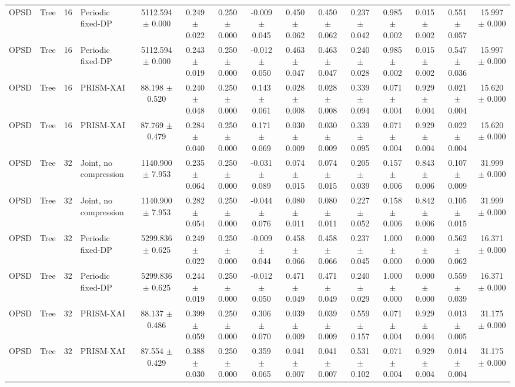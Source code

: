 \begin{tabular}{llllccccccccccc}
OPSD & Tree & 16 & Periodic fixed-DP & 5112.594 $\pm$ 0.000 & 0.249 $\pm$ 0.022 & 0.250 $\pm$ 0.000 & -0.009 $\pm$ 0.045 & 0.450 $\pm$ 0.062 & 0.450 $\pm$ 0.062 & 0.237 $\pm$ 0.042 & 0.985 $\pm$ 0.002 & 0.015 $\pm$ 0.002 & 0.551 $\pm$ 0.057 & 15.997 $\pm$ 0.000 \\
OPSD & Tree & 16 & Periodic fixed-DP & 5112.594 $\pm$ 0.000 & 0.243 $\pm$ 0.019 & 0.250 $\pm$ 0.000 & -0.012 $\pm$ 0.050 & 0.463 $\pm$ 0.047 & 0.463 $\pm$ 0.047 & 0.240 $\pm$ 0.028 & 0.985 $\pm$ 0.002 & 0.015 $\pm$ 0.002 & 0.547 $\pm$ 0.036 & 15.997 $\pm$ 0.000 \\
OPSD & Tree & 16 & PRISM-XAI & 88.198 $\pm$ 0.520 & 0.240 $\pm$ 0.048 & 0.250 $\pm$ 0.000 & 0.143 $\pm$ 0.061 & 0.028 $\pm$ 0.008 & 0.028 $\pm$ 0.008 & 0.339 $\pm$ 0.094 & 0.071 $\pm$ 0.004 & 0.929 $\pm$ 0.004 & 0.021 $\pm$ 0.004 & 15.620 $\pm$ 0.000 \\
OPSD & Tree & 16 & PRISM-XAI & 87.769 $\pm$ 0.479 & 0.284 $\pm$ 0.040 & 0.250 $\pm$ 0.000 & 0.171 $\pm$ 0.069 & 0.030 $\pm$ 0.009 & 0.030 $\pm$ 0.009 & 0.339 $\pm$ 0.095 & 0.071 $\pm$ 0.004 & 0.929 $\pm$ 0.004 & 0.022 $\pm$ 0.004 & 15.620 $\pm$ 0.000 \\
OPSD & Tree & 32 & Joint, no compression & 1140.900 $\pm$ 7.953 & 0.235 $\pm$ 0.064 & 0.250 $\pm$ 0.000 & -0.031 $\pm$ 0.089 & 0.074 $\pm$ 0.015 & 0.074 $\pm$ 0.015 & 0.205 $\pm$ 0.039 & 0.157 $\pm$ 0.006 & 0.843 $\pm$ 0.006 & 0.107 $\pm$ 0.009 & 31.999 $\pm$ 0.000 \\
OPSD & Tree & 32 & Joint, no compression & 1140.900 $\pm$ 7.953 & 0.282 $\pm$ 0.054 & 0.250 $\pm$ 0.000 & -0.044 $\pm$ 0.076 & 0.080 $\pm$ 0.011 & 0.080 $\pm$ 0.011 & 0.227 $\pm$ 0.052 & 0.158 $\pm$ 0.006 & 0.842 $\pm$ 0.006 & 0.105 $\pm$ 0.015 & 31.999 $\pm$ 0.000 \\
OPSD & Tree & 32 & Periodic fixed-DP & 5299.836 $\pm$ 0.625 & 0.249 $\pm$ 0.022 & 0.250 $\pm$ 0.000 & -0.009 $\pm$ 0.044 & 0.458 $\pm$ 0.066 & 0.458 $\pm$ 0.066 & 0.237 $\pm$ 0.045 & 1.000 $\pm$ 0.000 & 0.000 $\pm$ 0.000 & 0.562 $\pm$ 0.062 & 16.371 $\pm$ 0.000 \\
OPSD & Tree & 32 & Periodic fixed-DP & 5299.836 $\pm$ 0.625 & 0.244 $\pm$ 0.019 & 0.250 $\pm$ 0.000 & -0.012 $\pm$ 0.050 & 0.471 $\pm$ 0.049 & 0.471 $\pm$ 0.049 & 0.240 $\pm$ 0.029 & 1.000 $\pm$ 0.000 & 0.000 $\pm$ 0.000 & 0.559 $\pm$ 0.039 & 16.371 $\pm$ 0.000 \\
OPSD & Tree & 32 & PRISM-XAI & 88.137 $\pm$ 0.486 & 0.399 $\pm$ 0.059 & 0.250 $\pm$ 0.000 & 0.306 $\pm$ 0.070 & 0.039 $\pm$ 0.009 & 0.039 $\pm$ 0.009 & 0.559 $\pm$ 0.157 & 0.071 $\pm$ 0.004 & 0.929 $\pm$ 0.004 & 0.013 $\pm$ 0.005 & 31.175 $\pm$ 0.000 \\
OPSD & Tree & 32 & PRISM-XAI & 87.554 $\pm$ 0.429 & 0.388 $\pm$ 0.030 & 0.250 $\pm$ 0.000 & 0.359 $\pm$ 0.065 & 0.041 $\pm$ 0.007 & 0.041 $\pm$ 0.007 & 0.531 $\pm$ 0.102 & 0.071 $\pm$ 0.004 & 0.929 $\pm$ 0.004 & 0.014 $\pm$ 0.004 & 31.175 $\pm$ 0.000 \\
\bottomrule
\end{tabular}
